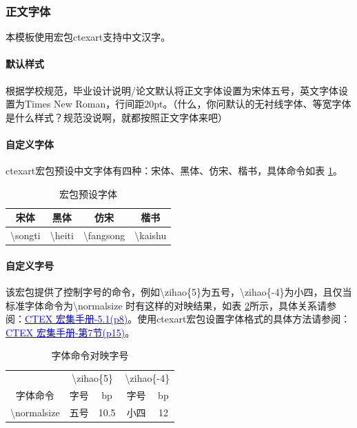 \documentclass[AutoFakeBold]{ZafuThesis}
\begin{document}
\subsubsection{正文字体}
本模板使用宏包ctexart支持中文汉字。\par
\paragraph{默认样式}
根据学校规范，毕业设计说明/论文默认将正文字体设置为宋体五号，英文字体设置为Times New Roman，行间距20pt。（什么，你问默认的无衬线字体、等宽字体是什么样式？规范没说啊，就都按照正文字体来吧）\par
\paragraph{自定义字体}
ctexart宏包预设中文字体有四种：宋体、黑体、仿宋、楷书，具体命令如表 \ref{table_宏包预设字体}。
\begin{table}[htbp]
  \centering  
    \caption{宏包预设字体}
    \begin{tabular}{c c c c}
      \toprule[1pt]
      宋体 & 黑体 & 仿宋 & 楷书 \\
      \hline
      \textbackslash songti & \textbackslash heiti & \textbackslash fangsong & \textbackslash kaishu \\
      \toprule[1pt]
    \end{tabular}
    \label{table_宏包预设字体} 
\end{table}\par

\paragraph{自定义字号}
该宏包提供了控制字号的命令，例如\textbackslash zihao\{5\}为五号，\textbackslash zihao\{-4\}为小四，且仅当标准字体命令为\textbackslash normalsize 时有这样的对映结果，如表 \ref{table_字体命令对映字号}所示，具体关系请参阅：\href{https://mirrors.ibiblio.org/CTAN/language/chinese/ctex/ctex.pdf}{\textcolor{blue}{CTEX 宏集手册-5.1(p8)}}。使用ctexart宏包设置字体格式的具体方法请参阅：\href{https://mirrors.ibiblio.org/CTAN/language/chinese/ctex/ctex.pdf}{\textcolor{blue}{CTEX 宏集手册-第7节(p15)}}。

\begin{table}[htbp]
  \centering
    \caption{字体命令对映字号}
    \begin{tabular}{c c c c c}
      \toprule[1pt]
      & \multicolumn{2}{c|}{\textbackslash zihao\{5\}} & \multicolumn{2}{c}{\textbackslash zihao\{-4\}}  \\
      字体命令 & 字号 &\multicolumn{1}{c|}{bp}  & 字号 & bp \\
      \hline
      \textbackslash normalsize & 五号 & 10.5  &  小四 & 12 \\
      \toprule[1pt]
    \end{tabular}
    \label{table_字体命令对映字号}
  \end{table}
\end{document}

